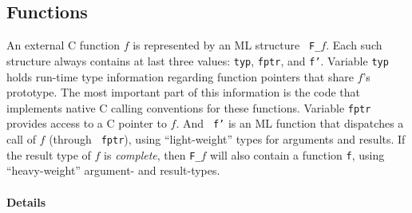 \documentclass[titlepage,letterpaper]{article}
\begin{document}
\subsection{Functions}

An external C function $f$ is represented by an ML structure {\tt
  F\_}$f$.  Each such structure always contains at last three values:
{\tt typ}, {\tt fptr}, and {\tt f'}.  Variable {\tt typ} holds
run-time type information regarding function pointers that share $f$'s
prototype.  The most important part of this information is the code
that implements native C calling conventions for these functions.
Variable {\tt fptr} provides access to a C pointer to $f$.  And {\tt
  f'} is an ML function that dispatches a call of $f$ (through {\tt
  fptr}), using ``light-weight'' types for arguments and results.  If
the result type of $f$ is {\em complete}, then {\tt F\_}$f$ will also
contain a function {\tt f}, using ``heavy-weight'' argument- and
result-types.

\paragraph*{Details}
\end{document}
